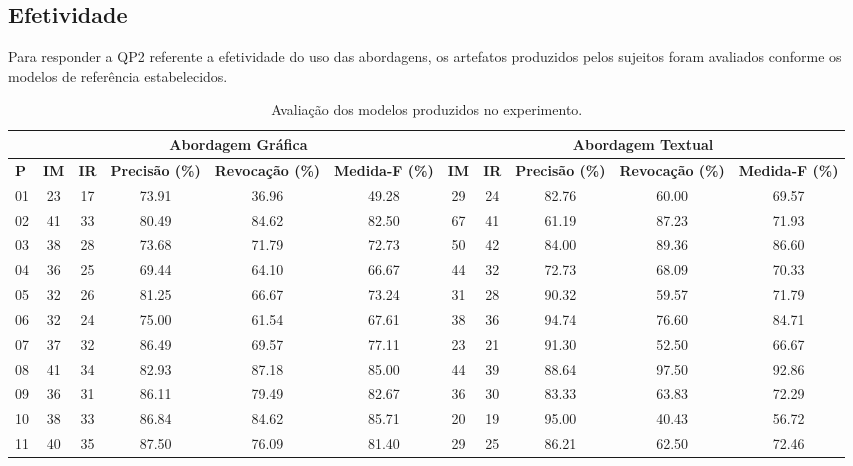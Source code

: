 \subsection{Efetividade}
Para responder a \ac{QP}2 referente a efetividade do uso das abordagens, os artefatos produzidos pelos sujeitos foram avaliados conforme os modelos de referência estabelecidos.

\begin{landscape}
\begin{table}[!htb]
    \caption{Avaliação dos modelos produzidos no experimento.}
    \label{tab:ResultsModelosIndividual}
    \centering
    \footnotesize
    
    \begin{tabular}{l|cc|ccc|cc|ccc}
    \bottomrule
    \rowcolor[HTML]{C0C0C0}
    \multicolumn{1}{l}{} &
    \multicolumn{5}{c}{\textbf{Abordagem Gráfica}} &
    \multicolumn{5}{c}{\textbf{Abordagem Textual}}
    \\ 
    \hline
    \rowcolor[HTML]{C0C0C0}
    \textbf{P} & \textbf{IM} & \textbf{IR} & \textbf{Precisão (\%)} & \textbf{Revocação (\%)} & \textbf{Medida-F (\%)} &
    \textbf{IM} & \textbf{IR} & \textbf{Precisão (\%)} & \textbf{Revocação (\%)} & \textbf{Medida-F (\%)}
    \\
    01	&	23	&	17	&	73.91	&	36.96	&	49.28	&	29	&	24	&	82.76	&	60.00	&	69.57	\\
    02	&	41	&	33	&	80.49	&	84.62	&	82.50	&	67	&	41	&	61.19	&	87.23	&	71.93	\\
    03	&	38	&	28	&	73.68	&	71.79	&	72.73	&	50	&	42	&	84.00	&	89.36	&	86.60	\\
    04	&	36	&	25	&	69.44	&	64.10	&	66.67	&	44	&	32	&	72.73	&	68.09	&	70.33	\\
    05	&	32	&	26	&	81.25	&	66.67	&	73.24	&	31	&	28	&	90.32	&	59.57	&	71.79	\\
    06	&	32	&	24	&	75.00	&	61.54	&	67.61	&	38	&	36	&	94.74	&	76.60	&	84.71	\\
    07	&	37	&	32	&	86.49	&	69.57	&	77.11	&	23	&	21	&	91.30	&	52.50	&	66.67	\\
    08	&	41	&	34	&	82.93	&	87.18	&	85.00	&	44	&	39	&	88.64	&	97.50	&	92.86	\\
    09	&	36	&	31	&	86.11	&	79.49	&	82.67	&	36	&	30	&	83.33	&	63.83	&	72.29	\\
    10	&	38	&	33	&	86.84	&	84.62	&	85.71	&	20	&	19	&	95.00	&	40.43	&	56.72	\\
    11	&	40	&	35	&	87.50	&	76.09	&	81.40	&	29	&	25	&	86.21	&	62.50	&	72.46	\\

\end{tabular}
\end{table}
\end{landscape}
